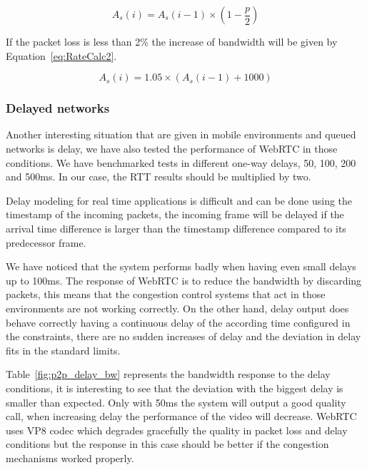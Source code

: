 \begin{equation}
	A_s ( i ) = A_s ( i - 1 ) \times (1 - \frac{p}{2}) 
	\label{eq:RateCalc}
\end{equation}

If the packet loss is less than 2\% the increase of bandwidth will be given by Equation~\ref{eq:RateCalc2}.

\begin{equation}
	A_s ( i ) = 1.05 \times (A_s ( i - 1 ) + 1000) 
	\label{eq:RateCalc2}
\end{equation}

\subsubsection{Delayed networks}

Another interesting situation that are given in mobile environments and queued networks is delay, we have also tested the performance of WebRTC in those conditions. We have benchmarked tests in different one-way delays, 50, 100, 200 and 500ms. In our case, the RTT results should be multiplied by two.

Delay modeling for real time applications is difficult and can be done using the timestamp of the incoming packets, the incoming frame will be delayed if the arrival time difference is larger than the timestamp difference compared to its predecessor frame.

We have noticed that the system performs badly when having even small delays up to 100ms. The response of WebRTC is to reduce the bandwidth by discarding packets, this means that the congestion control systems that act in those environments are not working correctly. On the other hand, delay output does behave correctly having a continuous delay of the according time configured in the constraints, there are no sudden increases of delay and the deviation in delay fits in the standard limits.

Table~\ref{fig:p2p_delay_bw} represents the bandwidth response to the delay conditions, it is interesting to see that the deviation with the biggest delay is smaller than expected. Only with 50ms the system will output a good quality call, when increasing delay the performance of the video will decrease. WebRTC uses VP8 codec which degrades gracefully the quality in packet loss and delay conditions but the response in this case should be better if the congestion mechanisms worked properly.

